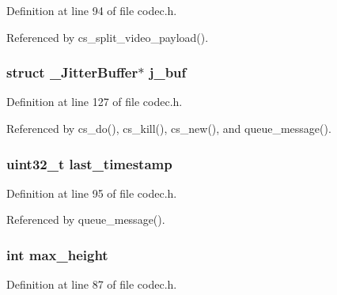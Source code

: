 Definition at line 94 of file codec.\+h.



Referenced by cs\+\_\+split\+\_\+video\+\_\+payload().

\hypertarget{struct___c_s_session_a7567f0c621b65df3ff9e6f46164ac1c0}{
\subsubsection[{j\+\_\+buf}]{\setlength{\rightskip}{0pt plus 5cm}struct {\bf \+\_\+\+Jitter\+Buffer}$\ast$ j\+\_\+buf}}\label{struct___c_s_session_a7567f0c621b65df3ff9e6f46164ac1c0}


Definition at line 127 of file codec.\+h.



Referenced by cs\+\_\+do(), cs\+\_\+kill(), cs\+\_\+new(), and queue\+\_\+message().

\hypertarget{struct___c_s_session_ab3eadf01045769905278f1908af23558}{
\subsubsection[{last\+\_\+timestamp}]{\setlength{\rightskip}{0pt plus 5cm}uint32\+\_\+t last\+\_\+timestamp}}\label{struct___c_s_session_ab3eadf01045769905278f1908af23558}


Definition at line 95 of file codec.\+h.



Referenced by queue\+\_\+message().

\hypertarget{struct___c_s_session_a3826471ddaa71d2730a6930625867bc1}{
\subsubsection[{max\+\_\+height}]{\setlength{\rightskip}{0pt plus 5cm}int max\+\_\+height}}\label{struct___c_s_session_a3826471ddaa71d2730a6930625867bc1}


Definition at line 87 of file codec.\+h.



